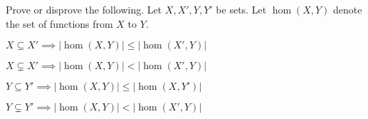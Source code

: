 Prove or disprove the following. Let $X,X', Y,Y'$ be
sets. Let $\hom(X,Y)$ denote the set of functions from $X$ to $Y$.
 \begin{mylist}
  \item $X \subseteq X' \implies |\hom(X,Y)| \leq |\hom(X',Y)|$
  \item $X \subsetneq X' \implies |\hom(X,Y)| < |\hom(X',Y)|$
  \item $Y \subseteq Y' \implies |\hom(X,Y)| \leq |\hom(X,Y')|$
  \item $Y \subsetneq Y' \implies |\hom(X,Y)| < |\hom(X',Y)|$
 \end{mylist}
